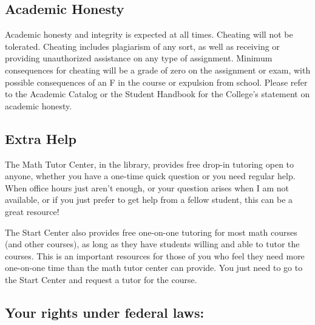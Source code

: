 \documentclass[11pt, a4paper]{article}
\begin{document}
\subsection*{Academic Honesty} Academic honesty and integrity is expected at all times. Cheating will not be tolerated. Cheating includes plagiarism of any sort, as well as receiving or providing unauthorized assistance on any type of assignment.  Minimum consequences for cheating will be a grade of zero on the assignment or exam, with possible consequences of an F in the course or expulsion from school. Please refer to the Academic Catalog or the Student Handbook for the College's statement on academic honesty.

\subsection*{Extra Help} The Math Tutor Center, in the library, provides free drop-in tutoring open to anyone, whether you have a one-time quick question or you need regular help. When office hours just aren't enough, or your question arises when I am not available, or if you just prefer to get help from a fellow student, this can be a great resource!

The Start Center also provides free one-on-one tutoring for most math courses (and other courses), as long as they have students willing and able to tutor the courses. This is an important resources for those of you who feel they need more one-on-one time than the math tutor center can provide. You just need to go to the Start Center and request a tutor for the course. 

\subsection*{Your rights under federal laws:}
\end{document}
